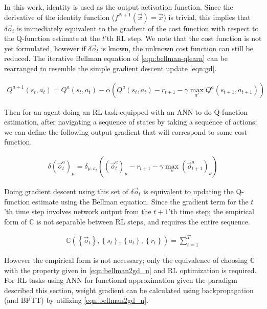 \documentclass[../dissertation.tex]{subfiles}
\begin{document}
In this work, identity is used as the output activation function.
Since the derivative of the identity function ($f^{N+1}(\vec{x}) = \vec{x}$) is trivial, this implies that $\delta \vec{o}_t$ is immediately equivalent to the gradient of the cost function with respect to the Q-function estimate at the $t$'th RL step.
We note that the cost function is not yet formulated, however if $\delta \vec{o}_t$ is known, the unknown cost function can still be reduced.
The iterative Bellman equation of \cref{eqn:bellman-qlearn} can be rearranged to resemble the simple gradient descent update \cref{eqn:gd}.

\begin{align}
    \label{eqn:bellman2gd_q}
    Q^{a + 1}\left( s_t, a_t \right) = Q^a\left( s_t, a_t \right) - \alpha \left(
          Q^a\left( s_t, a_t \right)
        - r_{t+1}
        - \gamma \max_{a'} Q^a\left( s_{t + 1}, a_{t + 1} \right)
    \right)
\end{align}

Then for an agent doing an RL task equipped with an ANN to do Q-function estimation, after navigating a sequence of states by taking a sequence of actions; we can define the following output gradient that will correspond to some cost function.

\begin{align}
    \label{eqn:bellman2gd_n}
    \delta \left( \vec{o}^a_t \right)_\mu = \delta_{\mu, a_t} \left(
          \left( \vec{o}^a_t \right)_\mu
        - r_{t + 1}
        - \gamma \max_{\nu} \left( \vec{o}^a_{t + 1} \right)_\nu
    \right)
\end{align}

Doing gradient descent using this set of $\delta \vec{o}_t$ is equivalent to updating the Q-function estimate using the Bellman equation.
Since the gradient term for the $t$'th time step involves network output from the $t+1$'th time step; the empirical form of $\mathbb{C}$ is not separable between RL steps, and requires the entire sequence.

\begin{align}
    \label{eqn:bellman2gd_cost}
    \mathbb{C}\left( \left\{ \vec{o}_t \right\}, \left\{ s_t \right\}, \left\{ a_t \right\},  \left\{ r_t \right\} \right) = 
        \sum_{t = 1}^T 
\end{align}

However the empirical form is not necessary; only the equivalence of choosing $\mathbb{C}$ with the property given in \cref{eqn:bellman2gd_n} and RL optimization is required.
For RL tasks using ANN for functional approximation given the paradigm described this section, weight gradient can be calculated using backpropagation (and BPTT) by utilizing \cref{eqn:bellman2gd_n}.
\end{document}

